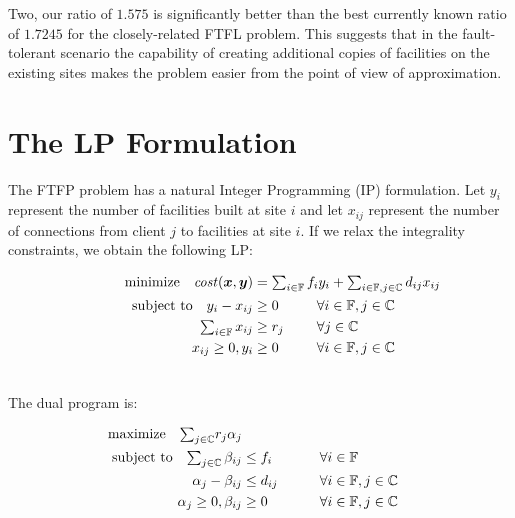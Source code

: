 \documentclass[11pt]{article}
\begin{document}
Two, our ratio of $1.575$ is significantly better than the
best currently known ratio of $1.7245$ for the
closely-related FTFL problem. This suggests that in the
fault-tolerant scenario the capability of creating
additional copies of facilities on the existing sites makes
the problem easier from the point of view of approximation.


\section{The LP Formulation}\label{sec: the lp formulation}

The FTFP problem has a natural Integer Programming (IP)
formulation. Let $y_i$ represent the number of facilities
built at site $i$ and let $x_{ij}$ represent the number of
connections from client $j$ to facilities at site $i$. If we
relax the integrality constraints, we obtain the following LP:


\begin{alignat}{3}
  \textrm{minimize} \quad \cost(\bfx,\bfy) &= \textstyle{\sum_{i\in \sitesset}f_iy_i 
								+ \sum_{i\in \sitesset, j\in \clientset}d_{ij}x_{ij}}\label{eqn:fac_primal}\hspace{-1.5in}&&
									\\ \notag
  \textrm{subject to}\quad y_i - x_{ij} &\geq 0 			&\quad 		&\forall i\in \sitesset, j\in \clientset 
									\\ \notag
     \textstyle{\sum_{i\in \sitesset} x_{ij}} &\geq r_j  &			&\forall j\in \clientset
 									\\ \notag
  	  x_{ij} \geq 0, y_i &\geq 0 						& 			&\forall i\in \sitesset, j\in \clientset 
  									\\ \notag
\end{alignat}


\noindent
The dual program is:

\begin{alignat}{3}
  \textrm{maximize}\quad \textstyle{\sum_{j\in \mathbb{C}}} r_j\alpha_j&\label{eqn:fac_dual}  
     						\\ \notag
  \textrm{subject to} \quad \textstyle{
    \sum_{j\in \mathbb{C}}\beta_{ij}} &\leq f_i  &\quad\quad			&\forall i \in \mathbb{F}  
							\\ \notag
  \alpha_{j} - \beta_{ij} 	&\leq  d_{ij}       &                 & \forall i\in \mathbb{F}, j\in \mathbb{C} 
							\\ \notag
  \alpha_j \geq 0, \beta_{ij} &\geq 0           &            & \forall i\in \mathbb{F}, j\in \mathbb{C}
  							\\ \notag
\end{alignat}
\end{document}
